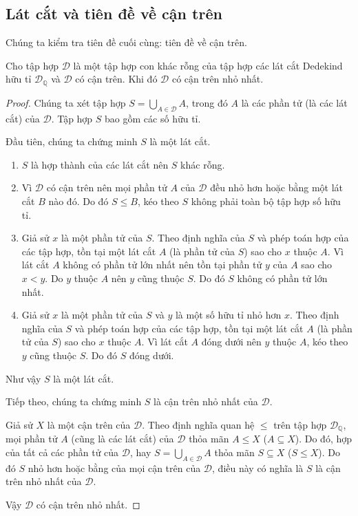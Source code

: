 \subsection{Lát cắt và tiên đề về cận trên}

Chúng ta kiểm tra tiên đề cuối cùng: tiên đề về cận trên.

\begin{theorem}
    Cho tập hợp $\mathscr{D}$ là một tập hợp con khác rỗng của tập hợp các lát cắt Dedekind hữu tỉ $\mathscr{D}_{\mathbb{Q}}$ và $\mathscr{D}$ có cận trên. Khi đó $\mathscr{D}$ có cận trên nhỏ nhất.
\end{theorem}

\begin{proof}
    Chúng ta xét tập hợp $S = \bigcup\limits_{A\in\mathscr{D}} A$, trong đó $A$ là các phần tử (là các lát cắt) của $\mathscr{D}$. Tập hợp $S$ bao gồm các số hữu tỉ.

    Đầu tiên, chúng ta chứng minh $S$ là một lát cắt.
    \begin{enumerate}[label={(DC\arabic*)}, itemindent=0.2cm]
        \item $S$ là hợp thành của các lát cắt nên $S$ khác rỗng.
        \item Vì $\mathscr{D}$ có cận trên nên mọi phần tử $A$ của $\mathscr{D}$ đều nhỏ hơn hoặc bằng một lát cắt $B$ nào đó. Do đó $S\leq B$, kéo theo $S$ không phải toàn bộ tập hợp số hữu tỉ.
        \item Giả sử $x$ là một phần tử của $S$. Theo định nghĩa của $S$ và phép toán hợp của các tập hợp, tồn tại một lát cắt $A$ (là phần tử của $S$) sao cho $x$ thuộc $A$. Vì lát cắt $A$ không có phần tử lớn nhất nên tồn tại phần tử $y$ của $A$ sao cho $x < y$. Do $y$ thuộc $A$ nên $y$ cũng thuộc $S$. Do đó $S$ không có phần tử lớn nhất.
        \item Giả sử $x$ là một phần tử của $S$ và $y$ là một số hữu tỉ nhỏ hơn $x$.  Theo định nghĩa của $S$ và phép toán hợp của các tập hợp, tồn tại một lát cắt $A$ (là phần tử của $S$) sao cho $x$ thuộc $A$. Vì lát cắt $A$ đóng dưới nên $y$ thuộc $A$, kéo theo $y$ cũng thuộc $S$. Do đó $S$ đóng dưới.
    \end{enumerate}

    Như vậy $S$ là một lát cắt.

    Tiếp theo, chúng ta chứng minh $S$ là cận trên nhỏ nhất của $\mathscr{D}$.

    Giả sử $X$ là một cận trên của $\mathscr{D}$. Theo định nghĩa quan hệ $\leq$ trên tập hợp $\mathscr{D}_{\mathbb{Q}}$, mọi phần tử $A$ (cũng là các lát cắt) của $\mathscr{D}$ thỏa mãn $A\leq X$ ($A\subseteq X$). Do đó, hợp của tất cả các phần tử của $\mathscr{D}$, hay $S = \bigcup\limits_{A\in\mathscr{D}} A$ thỏa mãn $S\subseteq X$ ($S\leq X$). Do đó $S$ nhỏ hơn hoặc bằng của mọi cận trên của $\mathscr{D}$, điều này có nghĩa là $S$ là cận trên nhỏ nhất của $\mathscr{D}$.

    Vậy $\mathscr{D}$ có cận trên nhỏ nhất.
\end{proof}

